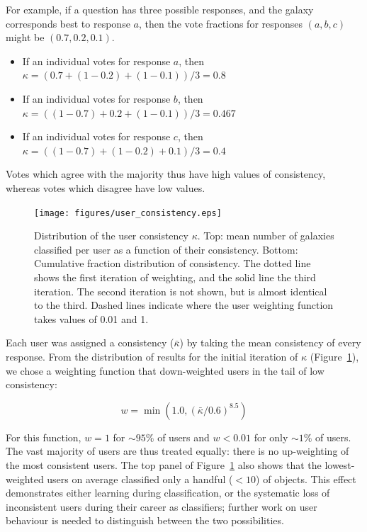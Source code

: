 \documentclass[useAMS,usenatbib]{mn2e}
\begin{document}
For example, if a question has three possible responses, and the galaxy corresponds best to response $a$, then the vote fractions for responses $(a, b, c)$ might be $(0.7, 0.2, 0.1)$.
\begin{itemize}
\item If an individual votes for response $a$, then \\$\kappa = (0.7 + (1-0.2) + (1-0.1))/3 = 0.8$
\item If an individual votes for response $b$, then \\$\kappa = ((1-0.7) + 0.2 + (1-0.1))/3 = 0.467$
\item If an individual votes for response $c$, then \\$\kappa = ((1-0.7) + (1-0.2) + 0.1)/3 = 0.4$
\end{itemize}
\noindent Votes which agree with the majority thus have high values of consistency, whereas votes which disagree have low values.

\begin{figure}
\texttt{[image: figures/user\_consistency.eps]}
\caption{Distribution of the user consistency $\kappa$. Top: mean number of galaxies classified per user as a function of their consistency. Bottom: Cumulative fraction distribution of consistency. The dotted line shows the first iteration of weighting, and the solid line the third iteration. The second iteration is not shown, but is almost identical to the third. Dashed lines indicate where the user weighting function takes values of 0.01 and 1. 
\label{fig-consistency}}
\end{figure}

Each user was assigned a consistency ($\bar{\kappa}$) by taking the mean consistency of every response. From the distribution of results for the initial iteration of $\kappa$ (Figure~\ref{fig-consistency}), we chose a weighting function that down-weighted users in the tail of low consistency:

\begin{equation}
w = \min \left(1.0,(\bar{\kappa} / 0.6)^{8.5} \right)
\label{eqn-weight}
\end{equation}

\noindent For this function, $w=1$ for $\sim95\%$ of users and $w<0.01$ for only $\sim1\%$ of users. The vast majority of users are thus treated equally: there is no up-weighting of the most consistent users. The top panel of Figure~\ref{fig-consistency} also shows that the lowest-weighted users on average classified only a handful ($<10$) of objects. This effect demonstrates either learning during classification, or the systematic loss of inconsistent users during their career as classifiers; further work on user behaviour is needed to distinguish between the two possibilities.
\end{document}

